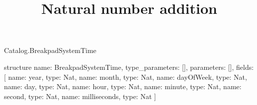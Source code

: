 \begin{lexlean}{Catalog.BreakpadSystemTime}
\title{Natural number addition}
\begin{semanticmodule}
structure{
  name: BreakpadSystemTime,
  type_parameters: [],
  parameters: [],
  fields: [
    {name: year, type: Nat},
    {name: month, type: Nat},
    {name: dayOfWeek, type: Nat},
    {name: day, type: Nat},
    {name: hour, type: Nat},
    {name: minute, type: Nat},
    {name: second, type: Nat},
    {name: milliseconds, type: Nat}
  ]
}
\end{semanticmodule}
\end{lexlean}
